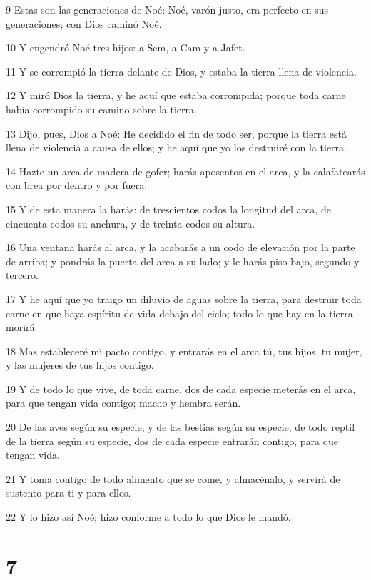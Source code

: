 \par 9 Estas son las generaciones de Noé: Noé, varón justo, era perfecto en sus generaciones; con Dios caminó Noé.
\par 10 Y engendró Noé tres hijos: a Sem, a Cam y a Jafet.
\par 11 Y se corrompió la tierra delante de Dios, y estaba la tierra llena de violencia.
\par 12 Y miró Dios la tierra, y he aquí que estaba corrompida; porque toda carne había corrompido su camino sobre la tierra.
\par 13 Dijo, pues, Dios a Noé: He decidido el fin de todo ser, porque la tierra está llena de violencia a causa de ellos; y he aquí que yo los destruiré con la tierra.
\par 14 Hazte un arca de madera de gofer; harás aposentos en el arca, y la calafatearás con brea por dentro y por fuera.
\par 15 Y de esta manera la harás: de trescientos codos la longitud del arca, de cincuenta codos su anchura, y de treinta codos su altura.
\par 16 Una ventana harás al arca, y la acabarás a un codo de elevación por la parte de arriba; y pondrás la puerta del arca a su lado; y le harás piso bajo, segundo y tercero.
\par 17 Y he aquí que yo traigo un diluvio de aguas sobre la tierra, para destruir toda carne en que haya espíritu de vida debajo del cielo; todo lo que hay en la tierra morirá.
\par 18 Mas estableceré mi pacto contigo, y entrarás en el arca tú, tus hijos, tu mujer, y las mujeres de tus hijos contigo.
\par 19 Y de todo lo que vive, de toda carne, dos de cada especie meterás en el arca, para que tengan vida contigo; macho y hembra serán.
\par 20 De las aves según su especie, y de las bestias según su especie, de todo reptil de la tierra según su especie, dos de cada especie entrarán contigo, para que tengan vida.
\par 21 Y toma contigo de todo alimento que se come, y almacénalo, y servirá de sustento para ti y para ellos.
\par 22 Y lo hizo así Noé; hizo conforme a todo lo que Dios le mandó.

\chapter{7}

